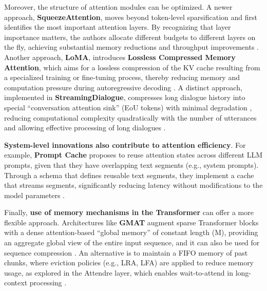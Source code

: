 \documentclass[11pt]{article}
\begin{document}
Moreover, the structure of attention modules can be optimized. A newer approach, \textbf{SqueezeAttention}, moves beyond token-level sparsification and first identifies the most important attention layers. By recognizing that layer importance matters, the authors allocate different budgets to different layers on the fly, achieving substantial memory reductions and throughput improvements \cite{ref174}. Another approach, \textbf{LoMA}, introduces \textbf{Lossless Compressed Memory Attention}, which aims for a lossless compression of the KV cache resulting from a specialized training or fine-tuning process, thereby reducing memory and computation pressure during autoregressive decoding \cite{ref175}. A distinct approach, implemented in \textbf{StreamingDialogue}, compresses long dialogue history into special ``conversation attention sink'' (EoU tokens) with minimal degradation \cite{ref176}, reducing computational complexity quadratically with the number of utterances and allowing effective processing of long dialogues \cite{ref176}.

\textbf{System-level innovations also contribute to attention efficiency}. For example, \textbf{Prompt Cache} proposes to reuse attention states across different LLM prompts, given that they have overlapping text segments (e.g., system prompts). Through a schema that defines reusable text segments, they implement a cache that streams segments, significantly reducing latency without modifications to the model parameters \cite{ref177}.

Finally, \textbf{use of memory mechanisms in the Transformer} can offer a more flexible approach. Architectures like \textbf{GMAT} augment sparse Transformer blocks with a dense attention-based ``global memory'' of constant length (M), providing an aggregate global view of the entire input sequence, and it can also be used for sequence compression \cite{ref178}. An alternative is to maintain a FIFO memory of past chunks, where eviction policies (e.g., LRA, LFA) are applied to reduce memory usage, as explored in the Attendre layer, which enables wait-to-attend in long-context processing \cite{ref179}.
\end{document}
